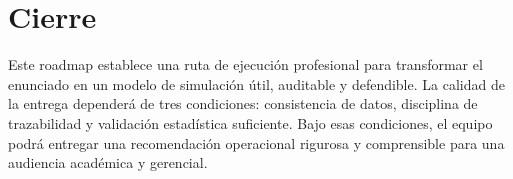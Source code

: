 \documentclass[11pt,letterpaper]{article}
\begin{document}
\section{Cierre}

Este roadmap establece una ruta de ejecución profesional para transformar el enunciado en un modelo de simulación útil, auditable y defendible. La calidad de la entrega dependerá de tres condiciones: consistencia de datos, disciplina de trazabilidad y validación estadística suficiente. Bajo esas condiciones, el equipo podrá entregar una recomendación operacional rigurosa y comprensible para una audiencia académica y gerencial.
\end{document}
